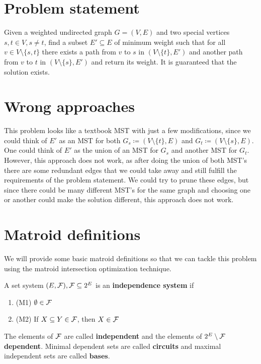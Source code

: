 \documentclass[english,12pt]{article}
\begin{document}
    \section{Problem statement}
        Given a weighted undirected graph $G = (V, E)$ and two special vertices $s, t \in V, s \neq t$, find a subset $E' \subseteq E$ of minimum weight such that for all $v \in V \setminus \{s, t\}$ there exists a path from $v$ to $s$ in $(V \setminus \{t\}, E')$ and another path from $v$ to $t$ in $(V \setminus \{s\}, E')$ and return its weight.
        It is guaranteed that the solution exists.

    \section{Wrong approaches}
        This problem looks like a textbook MST with just a few modifications, since we could think of $E'$ as an MST for both $G_s \coloneqq (V \setminus \{t\}, E)$ and $G_t \coloneqq (V \setminus \{s\}, E)$.
        One could think of $E'$ as the union of an MST for $G_s$ and another MST for $G_t$.
        However, this approach does not work, as after doing the union of both MST's there are some redundant edges that we could take away and still fulfill the requirements of the problem statement.
        We could try to prune these edges, but since there could be many different MST's for the same graph and choosing one or another could make the solution different, this approach does not work.

    \section{Matroid definitions}
        We will provide some basic matroid definitions so that we can tackle this problem using the matroid intersection optimization technique.
        \begin{definition}
            A set system $(E, \mathcal{F}), \mathcal{F} \subseteq 2^E$ is an \textbf{independence system} if
            \begin{enumerate}
                \item (M1) $\emptyset \in \mathcal{F}$
                \item (M2) If $X \subseteq Y \in \mathcal{F}$, then $X \in \mathcal{F}$
            \end{enumerate}
            The elements of $\mathcal{F}$ are called \textbf{independent} and the elements of $2^E \setminus \mathcal{F}$ \textbf{dependent}.
            Minimal dependent sets are called \textbf{circuits} and maximal independent sets are called $\textbf{bases}$.
        \end{definition}
\end{document}
